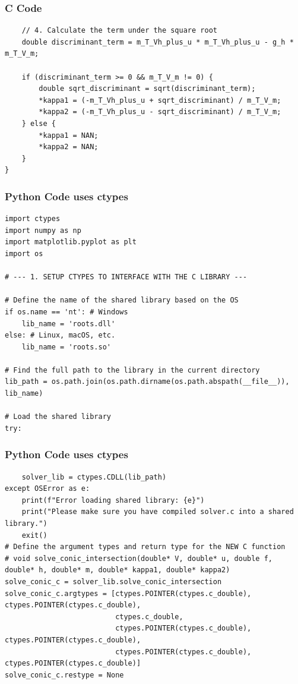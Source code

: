\documentclass{beamer}
\begin{document}
\begin{frame}[fragile]
\frametitle{C Code}
\begin{lstlisting}
    // 4. Calculate the term under the square root
    double discriminant_term = m_T_Vh_plus_u * m_T_Vh_plus_u - g_h * m_T_V_m;

    if (discriminant_term >= 0 && m_T_V_m != 0) {
        double sqrt_discriminant = sqrt(discriminant_term);
        *kappa1 = (-m_T_Vh_plus_u + sqrt_discriminant) / m_T_V_m;
        *kappa2 = (-m_T_Vh_plus_u - sqrt_discriminant) / m_T_V_m;
    } else {
        *kappa1 = NAN;
        *kappa2 = NAN;
    }
}
\end{lstlisting}
\end{frame}
\begin{frame}[fragile]
\frametitle{Python Code uses ctypes}
\begin{lstlisting}
import ctypes
import numpy as np
import matplotlib.pyplot as plt
import os

# --- 1. SETUP CTYPES TO INTERFACE WITH THE C LIBRARY ---

# Define the name of the shared library based on the OS
if os.name == 'nt': # Windows
    lib_name = 'roots.dll'
else: # Linux, macOS, etc.
    lib_name = 'roots.so'

# Find the full path to the library in the current directory
lib_path = os.path.join(os.path.dirname(os.path.abspath(__file__)), lib_name)

# Load the shared library
try:
\end{lstlisting}
\end{frame}
\begin{frame}[fragile]
\frametitle{Python Code uses ctypes}
\begin{lstlisting}
    solver_lib = ctypes.CDLL(lib_path)
except OSError as e:
    print(f"Error loading shared library: {e}")
    print("Please make sure you have compiled solver.c into a shared library.")
    exit()
# Define the argument types and return type for the NEW C function
# void solve_conic_intersection(double* V, double* u, double f, double* h, double* m, double* kappa1, double* kappa2)
solve_conic_c = solver_lib.solve_conic_intersection
solve_conic_c.argtypes = [ctypes.POINTER(ctypes.c_double), ctypes.POINTER(ctypes.c_double),
                          ctypes.c_double,
                          ctypes.POINTER(ctypes.c_double), ctypes.POINTER(ctypes.c_double),
                          ctypes.POINTER(ctypes.c_double), ctypes.POINTER(ctypes.c_double)]
solve_conic_c.restype = None
\end{lstlisting}
\end{frame}
\end{document}
